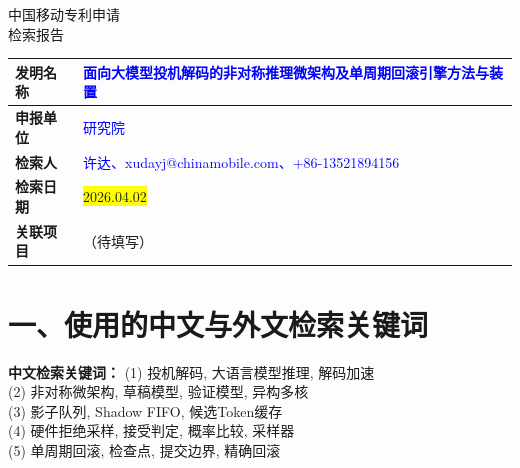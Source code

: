 \documentclass[12pt,a4paper]{article}
\begin{document}
\noindent

\vspace{1em}

\begin{center}
    {\Huge\heiti 中国移动专利申请} \\[0.5em]
    {\Huge\heiti 检索报告} \\[1em]
\end{center}

\begin{table}[h]
    \centering
    \renewcommand{\arraystretch}{2}
    \begin{tabular}{|p{3cm}|p{12cm}|}
        \hline
        \textbf{发明名称} & \textcolor{blue}{面向大模型投机解码的非对称推理微架构及单周期回滚引擎方法与装置} \\
        \hline
        \textbf{申报单位} & \textcolor{blue}{研究院} \\
        \hline
        \textbf{检索人} & \textcolor{blue}{许达、xudayj@chinamobile.com、+86-13521894156} \\
        \hline
        \textbf{检索日期} & \colorbox{yellow}{2026.04.02} \\
        \hline
        \textbf{关联项目} & （待填写） \\
        \hline
    \end{tabular}
\end{table}

\vspace{0.5em}

\noindent{}

\vspace{1em}


\section*{一、使用的中文与外文检索关键词}

\textbf{中文检索关键词：}
(1) 投机解码, 大语言模型推理, 解码加速 \\
(2) 非对称微架构, 草稿模型, 验证模型, 异构多核 \\
(3) 影子队列, Shadow FIFO, 候选Token缓存 \\
(4) 硬件拒绝采样, 接受判定, 概率比较, 采样器 \\
(5) 单周期回滚, 检查点, 提交边界, 精确回滚 \\
\end{document}
